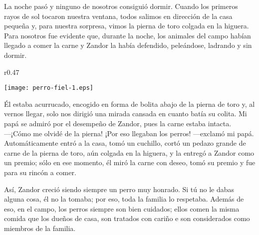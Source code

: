 La noche pasó y ninguno de nosotros consiguió dormir. 
Cuando los primeros rayos de sol tocaron nuestra ventana, todos salimos en dirección de la casa pequeña y, para nuestra sorpresa, vimos la pierna de toro colgada en la higuera. 
Para nosotros fue evidente que, durante la noche, los animales del campo habían llegado a comer la carne y Zandor la había defendido, peleándose, ladrando y sin dormir. 
\ifdefined\EnableIncludeImages
\begin{wrapfigure}{r}{0.47\textwidth}
  \begin{center}
  \vspace{-0.5cm}
    \texttt{[image: perro-fiel-1.eps]}
  \end{center}
  \vspace{-0.5cm}
\end{wrapfigure}
\fi
Él estaba acurrucado, encogido en forma de bolita abajo de la pierna de toro y, al vernos llegar, solo nos dirigió una mirada cansada en cuanto batía su colita. Mi papá se admiró por el desempeño de Zandor, pues la carne estaba intacta.\\\indent
---¡Cómo me olvidé de la pierna! ¡Por eso llegaban los perros! ---exclamó mi papá.\\\indent
Automáticamente entró a la casa, tomó un cuchillo, cortó un pedazo grande de carne de la pierna de toro, aún colgada en la higuera, y la entregó a Zandor como un premio; sólo en ese momento, él miró la carne con deseo, tomó su premio y fue para su rincón a comer.

Así, Zandor creció siendo siempre un perro muy honrado. Si tú no le dabas alguna cosa, él no la tomaba; por eso, toda la familia lo respetaba. Además de eso, en el campo, los perros siempre son bien cuidados; ellos comen la misma comida que los dueños de casa, son tratados con cariño e son considerados como miembros de la familia.


